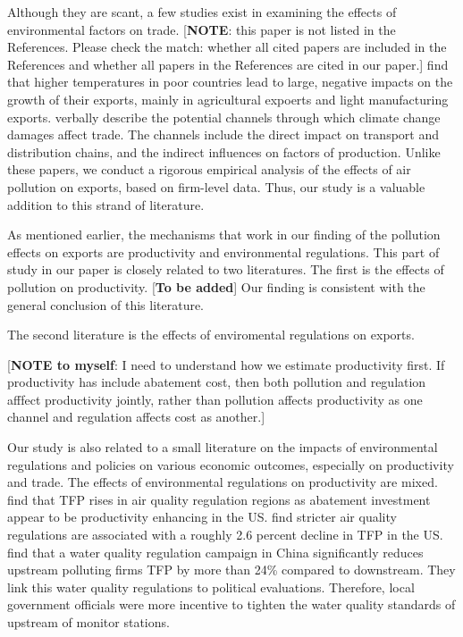 \documentclass[12pt]{article}
\begin{document}
Although they are scant, a few studies exist in examining the effects of
environmental factors on trade. \cite{jones2010climate} [\textbf{NOTE}: this
paper is not listed in the References. Please check the match: whether all
cited papers are included in the References and whether all papers in the
References are cited in our paper.] find that higher temperatures in poor
countries lead to large, negative impacts on the growth of their exports,
mainly in agricultural expoerts and light manufacturing exports. \cite%
{dellink2017international} verbally describe the potential channels through
which climate change damages affect trade. The channels include the direct
impact on transport and distribution chains, and the indirect influences on
factors of production. Unlike these papers, we conduct a rigorous empirical
analysis of the effects of air pollution on exports, based on firm-level
data. Thus, our study is a valuable addition to this strand of literature.

As mentioned earlier, the mechanisms that work in our finding of the
pollution effects on exports are productivity and environmental regulations.
This part of study in our paper is closely related to two literatures. The
first is the effects of pollution on productivity. [\textbf{To be added}]
Our finding is consistent with the general conclusion of this literature.

The second literature is the effects of enviromental regulations on exports.

[\textbf{NOTE to myself}: I need to understand how we estimate productivity
first. If productivity has include abatement cost, then both pollution and
regulation afffect productivity jointly, rather than pollution affects
productivity as one channel and regulation affects cost as another.]

Our study is also related to a small literature on the impacts of
environmental regulations and policies on various economic outcomes,
especially on productivity and trade. The effects of environmental
regulations on productivity are mixed. \cite{berman2001environmental} find
that TFP rises in air quality regulation regions as abatement investment
appear to be productivity enhancing in the US. \cite{greenstone2012effects}
find stricter air quality regulations are associated with a roughly 2.6
percent decline in TFP in the US. \cite{he2020watering} find that a water
quality regulation campaign in China significantly reduces upstream
polluting firms TFP by more than 24\% compared to downstream. They link this
water quality regulations to political evaluations. Therefore, local
government officials were more incentive to tighten the water quality
standards of upstream of monitor stations.
\end{document}
